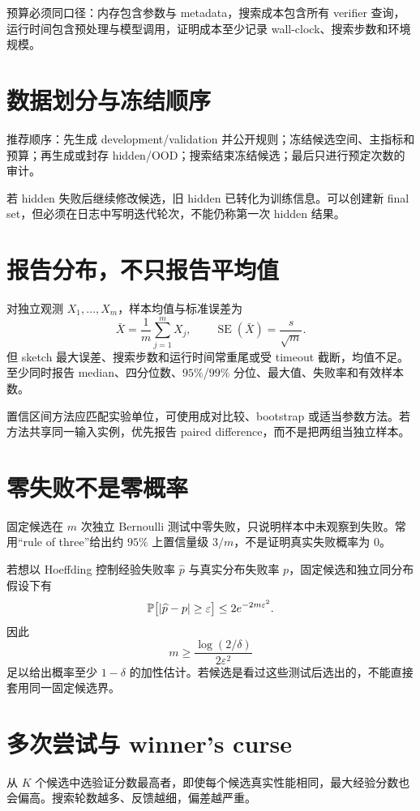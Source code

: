 预算必须同口径：内存包含参数与 metadata，搜索成本包含所有 verifier 查询，运行时间包含预处理与模型调用，证明成本至少记录 wall-clock、搜索步数和环境规模。

\section{数据划分与冻结顺序}

推荐顺序：先生成 development/validation 并公开规则；冻结候选空间、主指标和预算；再生成或封存 hidden/OOD；搜索结束冻结候选；最后只进行预定次数的审计。

若 hidden 失败后继续修改候选，旧 hidden 已转化为训练信息。可以创建新 final set，但必须在日志中写明迭代轮次，不能仍称第一次 hidden 结果。

\section{报告分布，不只报告平均值}

对独立观测 $X_1,\ldots,X_m$，样本均值与标准误差为
\[
\bar X=\frac1m\sum_{j=1}^mX_j,
\qquad
\operatorname{SE}(\bar X)=\frac{s}{\sqrt m}.
\]
但 sketch 最大误差、搜索步数和运行时间常重尾或受 timeout 截断，均值不足。至少同时报告 median、四分位数、$95\%$/$99\%$ 分位、最大值、失败率和有效样本数。

置信区间方法应匹配实验单位，可使用成对比较、bootstrap 或适当参数方法。若方法共享同一输入实例，优先报告 paired difference，而不是把两组当独立样本。

\section{零失败不是零概率}

固定候选在 $m$ 次独立 Bernoulli 测试中零失败，只说明样本中未观察到失败。常用“rule of three”给出约 $95\%$ 上置信量级 $3/m$，不是证明真实失败概率为 0。

若想以 Hoeffding 控制经验失败率 $\widehat p$ 与真实分布失败率 $p$，固定候选和独立同分布假设下有
\[
\mathbb{P}\bigl[|\widehat p-p|\ge\varepsilon\bigr]
\le 2e^{-2m\varepsilon^2}.
\]
因此
\[
m\ge\frac{\log(2/\delta)}{2\varepsilon^2}
\]
足以给出概率至少 $1-\delta$ 的加性估计。若候选是看过这些测试后选出的，不能直接套用同一固定候选界。

\section{多次尝试与 winner's curse}

从 $K$ 个候选中选验证分数最高者，即使每个候选真实性能相同，最大经验分数也会偏高。搜索轮数越多、反馈越细，偏差越严重。

